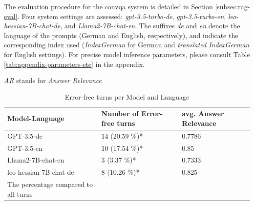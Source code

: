 The evaluation procedure for the \gls{convqa} system is detailed in Section \ref{subsec:rag-eval}. Four system settings are assessed: \textit{gpt-3.5-turbo-de}, \textit{gpt-3.5-turbo-en}, \textit{leo-hessian-7B-chat-de}, and \textit{Llama2-7B-chat-en}. The suffixes \textit{de} and \textit{en} denote the language of the prompts (German and English, respectively), and indicate the corresponding index used (\textit{IndexGerman} for German and \textit{translated IndexGerman} for English settings). For precise model inference parameters, please consult Table \ref{tab:appendix-parameters-ete} in the appendix.

\begin{table}[h]
    \centering
    {\raggedright\footnotesize * \textit{AR} stands for \textit{Answer Relevance}\par}
    \caption{Answer Relevance per Model, Language and Question Type}
    \label{tab:answer-relevance-per-model}
\end{table}

\begin{table}[]
    \centering
    \begin{tabular}{lll}
    \toprule
    Model-Language         & Number of Error-free turns & avg. Answer Relevance \\
    \midrule
    GPT-3.5-de             & 14 (20.59 \%)*              & 0.7786                \\
    GPT-3.5-en             & 10 (17.54 \%)*              & 0.85                  \\
    Llama2-7B-chat-en      & 3 (3.37 \%)*                & 0.7333                \\
    leo-hessian-7B-chat-de & 8 (10.26 \%)*               & 0.825                 \\
    \bottomrule
    {\raggedright\footnotesize * The percentage compared to all turns}
    \end{tabular}
    \caption{Error-free turns per Model and Language}
    \label{tab:correct-turns-per-model}
\end{table}

